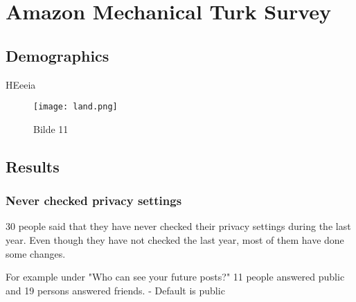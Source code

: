 \chapter{Amazon Mechanical Turk Survey}
\label{chp:amtsurvey} 

\section{Demographics}
HEeeia


\begin{figure}[h!]
\centering
\texttt{[image: land.png]}
\caption[Bilde 1]{Bilde 11} 
\label{fig:co}
\end{figure}

\section{Results}

\subsection{Never checked privacy settings}
30 people said that they have never checked their privacy settings during the last year. Even though they have not checked the last year, most of them have done some changes. 

For example under "Who can see your future posts?" 11 people answered public and 19 persons answered friends.
- Default is public

